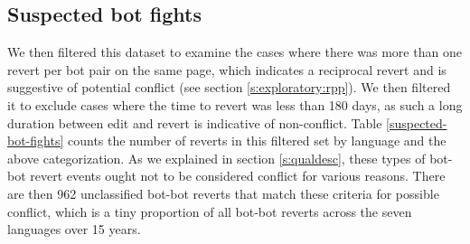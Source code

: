 \documentclass[format=acmsmall, review=false, screen=true]{acmart}%
\begin{document}
\subsection{Suspected bot fights}  
We then filtered this dataset to examine the cases where there was more than one revert per bot pair on the same page, which indicates a reciprocal revert and is suggestive of potential conflict (see section \ref{s:exploratory:rpp}). We then filtered it to exclude cases where the time to revert was less than 180 days, as such a long duration between edit and revert is indicative of non-conflict. Table \ref{suspected-bot-fights} counts the number of reverts in this filtered set by language and the above categorization. As we explained in section \ref{s:qualdesc}, these types of bot-bot revert events ought not to be considered conflict for various reasons. There are then 962 unclassified bot-bot reverts that match these criteria for possible conflict, which is a tiny proportion of all bot-bot reverts across the seven languages over 15 years.
\end{document}
